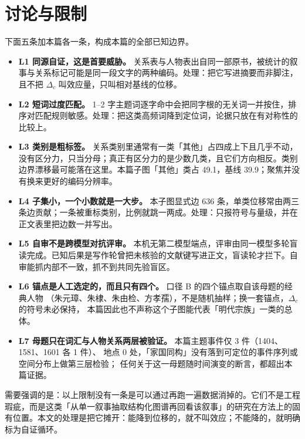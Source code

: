 \section{讨论与限制}

下面五条加本篇各一条，构成本篇的全部已知边界。

\begin{itemize}
\item \textbf{L1 同源自证，这是首要威胁。} 关系表与人物表出自同一部原书，被统计的叙事与关系标记可能是同一段文字的两种编码。处理：把它写进摘要而非脚注，且不把 $\Delta_c$ 叫效应量，只叫相对基线的位移。
\item \textbf{L2 短词过度匹配。} 1--2 字主题词逐字命中会把同字根的无关词一并按住，排序对匹配规则敏感。处理：把这类高频词降到定位词，论据只放在有对称性的比较上。
\item \textbf{L3 类别是粗标签。} 关系类别里通常有一类「其他」占四成上下且几乎不动，没有区分力，只当分母；真正有区分力的是少数几类，且它们方向相反。类别边界漂移最可能落在这里。本篇子图「其他」类占 49.1，基线 39.9；聚焦并没有换来更好的编码分辨率。
\item \textbf{L4 子集小，一个小数就是一大步。} 本子图显式边 636 条，单类位移常由两三条边贡献；一条被重标类别，比例就跳一两成。处理：只报符号与量级，并在正文表里把边数一并写出。
\item \textbf{L5 自审不是跨模型对抗评审。} 本机无第二模型端点，评审由同一模型多轮盲读完成。已知后果是写作轮曾把未核验的文献键写进正文，盲读轮才拦下。自审能抓内部不一致，抓不到共同先验盲区。
\item \textbf{L6 锚点是人工选定的，而且只有四个。} 口径 B 的四个锚点取自该母题的经典人物
（朱元璋、朱棣、朱由检、方孝孺），不是随机抽样；换一套锚点，$\Delta_c$ 的符号未必保持，
本篇因此也不声称这个子图能代表「明代宗族」一类的总体。
\item \textbf{L7 母题只在词汇与人物关系两层被验证。} 本篇主题事件仅 3 件（1404、1581、1601 各 1 件）、
地点 0 处，「家国同构」没有落到可定位的事件序列或空间分布上做第三层检验；
任何关于这一母题随时间演变的断言，都超出本篇证据。
\end{itemize}

需要强调的是：以上限制没有一条是可以通过再跑一遍数据消掉的。它们不是工程瑕疵，而是这类「从单一叙事抽取结构化图谱再回看该叙事」的研究在方法上的固有位置。本文的处理是把它摊开：能降到位移的，就不叫效应；不能降的，就明确标为自证循环。
